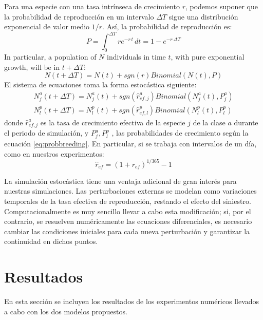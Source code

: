 Para una especie con una tasa intrínseca de crecimiento $r$, podemos suponer que la probabilidad de reproducción en un intervalo $\Delta T$ sigue una distribución exponencial de valor medio $1/r$. Así, la probabilidad de reproducción es:
\begin{equation}
\label{eq:probbreeding}
P = \int_0^{\Delta T} \! re^{-r\, t}  \, dt = 1 - e^{-r\, \Delta T}
\end{equation}
In particular, a population of $N$ individuals in time $t$, with pure exponential growth, will be in $t+\Delta T$:
\begin{equation}
N(t+\Delta T)=N(t) + sgn \left(r \right) Binomial \left( N(t),P \right)
\end{equation}
\noindent El sistema de ecuaciones toma la forma estocástica siguiente:
\begin{equation}
\begin{split}
N^{a}_{j}(t+\Delta T)=N^{a}_{j}(t) + sgn \left(\hat{r}^{a}_{ef,j} \right) Binomial \left( N^{a}_{j}(t),P^{a}_{j}\right)\\
N^{p}_{l}(t+\Delta T)=N^{p}_{l}(t) + sgn \left(\hat{r}^{p}_{ef,l} \right) Binomial \left(N^{p}_{l}(t),P^{p}_{l} \right)
\end{split}
\end{equation}
\noindent donde $\hat{r}^{a}_{ef,j}$ es la tasa de crecimiento efectiva de la especie $j$ de la clase $a$ durante el periodo de simulación, y $P^{a}_{j}, P^{p}_{l}$ , las probabilidades de crecimiento según la ecuación \ref{eq:probbreeding}. En particular, si se trabaja con intervalos de un día, como en nuestros experimentos:
\begin{equation}
\hat{r}_{ef} = (1+r_{ef})^{1/365}-1
\end{equation}

La simulación estocástica tiene una ventaja adicional de gran interés para nuestras simulaciones. Las perturbaciones externas se modelan como variaciones temporales de la tasa efectiva de reproducción, restando el efecto del siniestro. Computacionalmente es muy sencillo llevar a cabo esta modificación; si, por el contrario, se resuelven numéricamente las ecuaciones diferenciales, es necesario cambiar las condiciones iniciales para cada nueva perturbación y garantizar la continuidad en dichos puntos.

\section{Resultados}

En esta sección se incluyen los resultados de los experimentos numéricos llevados a cabo con los dos modelos propuestos.

